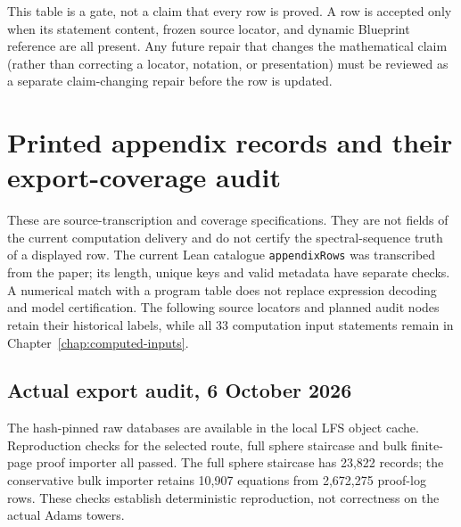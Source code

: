 This table is a gate, not a claim that every row is proved. A row is accepted
only when its statement content, frozen source locator, and dynamic Blueprint
reference are all present. Any future repair that changes the mathematical
claim (rather than correcting a locator, notation, or presentation) must be
reviewed as a separate claim-changing repair before the row is updated.

\section{Printed appendix records and their export-coverage audit}
\label{sec:appendix-export-coverage}

These are source-transcription and coverage specifications. They are not
fields of the current computation delivery and do not certify the
spectral-sequence truth of a displayed row. The current Lean catalogue
\texttt{appendixRows} was transcribed from the paper; its length, unique
keys and valid metadata have separate checks. A numerical match with a
program table does not replace expression decoding and model certification.
The following source locators and planned audit nodes retain their historical
labels, while all 33 computation input statements remain in
Chapter~\ref{chap:computed-inputs}.

\subsection*{Actual export audit, 6 October 2026}

The hash-pinned raw databases are available in the local LFS object cache.
Reproduction checks for the selected route, full sphere staircase and bulk
finite-page proof importer all passed. The full sphere staircase has 23,822
records; the conservative bulk importer retains 10,907 equations from
2,672,275 proof-log rows. These checks establish deterministic reproduction,
not correctness on the actual Adams towers.

